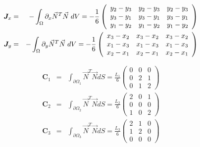 \begin{eqnarray}
{\bm J}_x &=& - \int_{\Omega} \partial_x \vec{N}^T \vec{N}   \; dV 
=-\frac{1}{6}
\left(
\begin{array}{ccc}
y_2-y_3 & y_2-y_3 & y_2-y_3 \\
y_3-y_1 & y_3-y_1 & y_3-y_1 \\
y_1-y_2 & y_1-y_2 & y_1-y_2 
\end{array}
\right) \nonumber\\
{\bm J}_y &=&  - \int_{\Omega} \partial_y \vec{N}^T \vec{N}   \; dV  
=-\frac{1}{6} 
\left(
\begin{array}{ccc}
x_3-x_2 & x_3-x_2 & x_3-x_2 \\
x_1-x_3 & x_1-x_3 & x_1-x_3 \\
x_2-x_1 & x_2-x_1 & x_2-x_1 
\end{array}
\right)
\end{eqnarray}




\begin{eqnarray}
{\bm C}_1 &=& \int_{\partial\Omega_1} \vec{N}^T\vec{N} dS 
= \frac{L_1}{6}
\left(
\begin{array}{ccc}
0 &0 &0\\
0 &2 &1\\
0 &1 &2
\end{array}
\right) \\
{\bm C}_2 &=& \int_{\partial\Omega_2} \vec{N}^T\vec{N} dS 
= \frac{L_2}{6}
\left(
\begin{array}{ccc}
2 &0 &1\\
0 &0 &0\\
1 &0 &2
\end{array}
\right) \\
{\bm C}_3 &=& \int_{\partial\Omega_3} \vec{N}^T\vec{N} dS 
= \frac{L_3}{6}
\left(
\begin{array}{ccc}
2 &1 &0\\
1 &2 &0\\
0 &0 &0
\end{array}
\right) 
\end{eqnarray}




